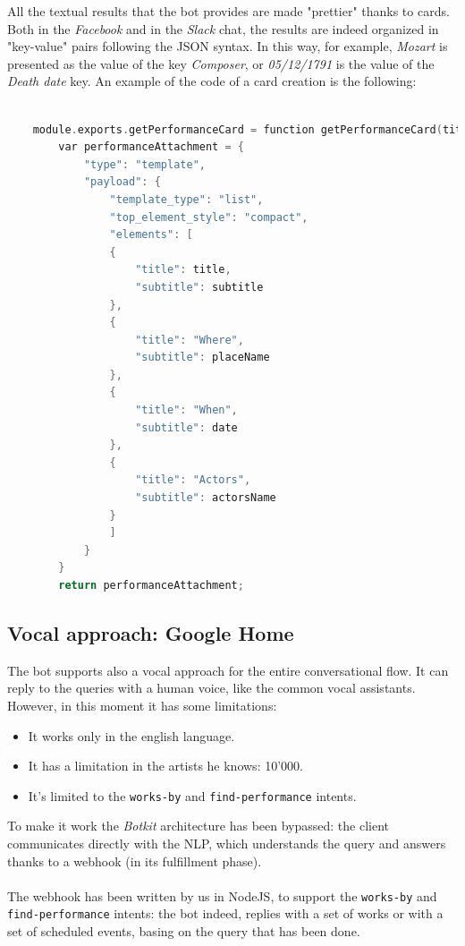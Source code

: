 \documentclass[a4paper,12pt]{report}
\begin{document}
	All the textual results that the bot provides are made "prettier" thanks to cards. Both in the \textit{Facebook} and in the \textit{Slack} chat, the results are indeed organized in "key-value" pairs following the JSON syntax. In this way, for example, \textit{Mozart} is presented as the value of the key \textit{Composer}, or \textit{05/12/1791} is the value of the \textit{Death date} key. An example of the code of a card creation is the following:
	\begin{lstlisting}[language=C]
	
	module.exports.getPerformanceCard = function getPerformanceCard(title, subtitle, placeName, actorsName, date) {  
		var performanceAttachment = {
			"type": "template",
			"payload": {
				"template_type": "list",
				"top_element_style": "compact",
				"elements": [
				{
					"title": title,
					"subtitle": subtitle
				},
				{
					"title": "Where",
					"subtitle": placeName
				},
				{
					"title": "When",
					"subtitle": date        
				},
				{
					"title": "Actors",
					"subtitle": actorsName        
				}
				] 
			}
		}
		return performanceAttachment;
	\end{lstlisting}
	
	\subsection{Vocal approach: Google Home}
	The bot supports also a vocal approach for the entire conversational flow. It can reply to the queries with a human voice, like the common vocal assistants. However, in this moment it has some limitations:
	\begin{itemize}
		\item It works only in the english language.
		\item It has a limitation in the artists he knows: 10'000.
		\item It's limited to the \texttt{works-by} and \texttt{find-performance} intents.
	\end{itemize}

	To make it work the \textit{Botkit} architecture has been bypassed: the client communicates directly with the NLP, which understands the query and answers thanks to a webhook (in its fulfillment phase).\\\\
	The webhook has been written by us in NodeJS, to support the \texttt{works-by} and \texttt{find-performance} intents: the bot indeed, replies with a set of works or with a set of scheduled events, basing on the query that has been done.
	
\end{document}
